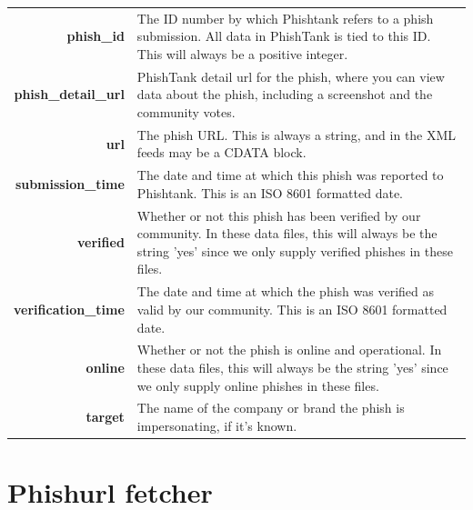 \documentclass[
  digital, %
  oneside, %
  table,   %
  nolof,     %
  nolot,     %
]{fithesis3}
\begin{document}
\begin{tabularx}{\linewidth}{ r X }
\toprule
\textbf{phish\_id} & The ID number by which Phishtank refers to a phish submission. All data in PhishTank is tied to this ID. This will always be a positive integer. \\
\textbf{phish\_detail\_url} & PhishTank detail url for the phish, where you can view data about the phish, including a screenshot and the community votes. \\ \textbf{url} & The phish URL. This is always a string, and in the XML feeds may be a CDATA block. \\
\textbf{submission\_time} & The date and time at which this phish was reported to Phishtank. This is an ISO 8601 formatted date. \\
\textbf{verified} & Whether or not this phish has been verified by our community. In these data files, this will always be the string 'yes' since we only supply verified phishes in these files. \\
\textbf{verification\_time} & The date and time at which the phish was verified as valid by our community. This is an ISO 8601 formatted date. \\
\textbf{online} & Whether or not the phish is online and operational. In these data files, this will always be the string 'yes' since we only supply online phishes in these files. \\
\textbf{target} & The name of the company or brand the phish is impersonating, if it's known. \\ \bottomrule
\end{tabularx}

\section{Phishurl fetcher}
\label{appendix:phishurl_fetcher}

\end{document}
